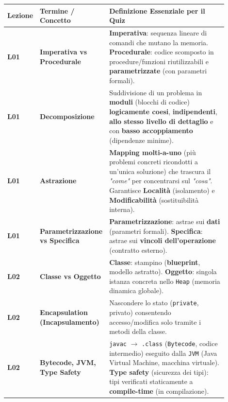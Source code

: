 \begingroup
\footnotesize
\renewcommand{\arraystretch}{1.18}
\begin{longtable}{>{\raggedright\arraybackslash}p{0.12\linewidth}>{\raggedright\arraybackslash}p{0.24\linewidth}>{\raggedright\arraybackslash}p{0.54\linewidth}}

\toprule

Lezione & Termine / Concetto & Definizione Essenziale per il Quiz \\

\midrule

\textbf{L01} & \textbf{Imperativa vs Procedurale} & \textbf{Imperativa}: sequenza lineare di comandi che mutano la memoria. \textbf{Procedurale}: codice scomposto in procedure/funzioni riutilizzabili e \textbf{parametrizzate} (con parametri formali). \\

\textbf{L01} & \textbf{Decomposizione} & Suddivisione di un problema in \textbf{moduli} (blocchi di codice) \textbf{logicamente coesi}, \textbf{indipendenti}, \textbf{allo stesso livello di dettaglio} e con \textbf{basso accoppiamento} (dipendenze minime). \\

\textbf{L01} & \textbf{Astrazione} & \textbf{Mapping molti-a-uno} (più problemi concreti ricondotti a un'unica soluzione) che trascura il \emph{"come"} per concentrarsi sul \emph{"cosa"}. Garantisce \textbf{Località} (isolamento) e \textbf{Modificabilità} (sostituibilità interna). \\

\textbf{L01} & \textbf{Parametrizzazione vs Specifica} & \textbf{Parametrizzazione}: astrae sui \textbf{dati} (parametri formali). \textbf{Specifica}: astrae sui \textbf{vincoli dell'operazione} (contratto esterno). \\

\textbf{L02} & \textbf{Classe vs Oggetto} & \textbf{Classe}: stampino (\textbf{blueprint}, modello astratto). \textbf{Oggetto}: singola istanza concreta nello \texttt{Heap} (memoria dinamica globale). \\

\textbf{L02} & \textbf{Encapsulation (Incapsulamento)} & Nascondere lo stato (\texttt{private}, privato) consentendo accesso/modifica solo tramite i metodi della classe. \\

\textbf{L02} & \textbf{Bytecode, JVM, Type Safety} & \texttt{javac} $\to$ \texttt{.class} (\texttt{Bytecode}, codice intermedio) eseguito dalla \texttt{JVM} (Java Virtual Machine, macchina virtuale). \textbf{Type safety} (sicurezza dei tipi): tipi verificati staticamente a \textbf{compile-time} (in compilazione). \\


\end{longtable}
